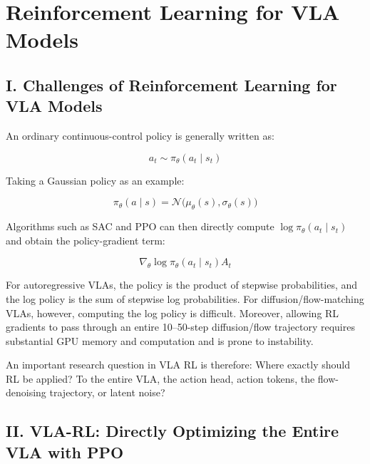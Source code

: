 \setcounter{section}{1}

\hypertarget{reinforcement-learning-for-vla-models}{%
\section{Reinforcement Learning for VLA Models}\label{reinforcement-learning-for-vla-models}}

\hypertarget{i.-challenges-of-reinforcement-learning-for-vla-models}{%
\subsection{I. Challenges of Reinforcement Learning for VLA Models}\label{i.-challenges-of-reinforcement-learning-for-vla-models}}

An ordinary continuous-control policy is generally written as:

\[
a_t\sim\pi_\theta(a_t\mid s_t)
\]

Taking a Gaussian policy as an example:

\[
\pi_\theta(a\mid s)=\mathcal{N}\bigl(\mu_\theta(s),\sigma_\theta(s)\bigr)
\]

Algorithms such as SAC and PPO can then directly compute \(\log\pi_\theta(a_t\mid s_t)\) and obtain the policy-gradient term:

\[
\nabla_\theta\log\pi_\theta(a_t\mid s_t)A_t
\]

For autoregressive VLAs, the policy is the product of stepwise probabilities, and the log policy is the sum of stepwise log probabilities. For diffusion/flow-matching VLAs, however, computing the log policy is difficult. Moreover, allowing RL gradients to pass through an entire 10--50-step diffusion/flow trajectory requires substantial GPU memory and computation and is prone to instability.

An important research question in VLA RL is therefore: Where exactly should RL be applied? To the entire VLA, the action head, action tokens, the flow-denoising trajectory, or latent noise?

\hypertarget{ii.-vla-rl-directly-optimizing-the-entire-vla-with-ppo}{%
\subsection{II. VLA-RL: Directly Optimizing the Entire VLA with PPO}\label{ii.-vla-rl-directly-optimizing-the-entire-vla-with-ppo}}

